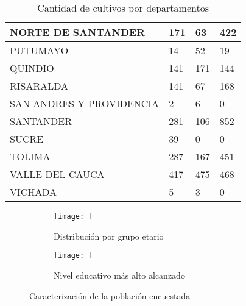 \documentclass[12pt,a4paper]{article}
\begin{document}
\begin{table}[]
\begin{tabular}{|llll|}
        \multicolumn{1}{|l|}{NORTE DE SANTANDER}       & \multicolumn{1}{l|}{171}               & \multicolumn{1}{l|}{63}              & 422           \\ \hline
        \multicolumn{1}{|l|}{PUTUMAYO}                 & \multicolumn{1}{l|}{14}                & \multicolumn{1}{l|}{52}              & 19            \\ \hline
        \multicolumn{1}{|l|}{QUINDIO}                  & \multicolumn{1}{l|}{141}               & \multicolumn{1}{l|}{171}             & 144           \\ \hline
        \multicolumn{1}{|l|}{RISARALDA}                & \multicolumn{1}{l|}{141}               & \multicolumn{1}{l|}{67}              & 168           \\ \hline
        \multicolumn{1}{|l|}{SAN ANDRES Y PROVIDENCIA} & \multicolumn{1}{l|}{2}                 & \multicolumn{1}{l|}{6}               & 0             \\ \hline
        \multicolumn{1}{|l|}{SANTANDER}                & \multicolumn{1}{l|}{281}               & \multicolumn{1}{l|}{106}             & 852           \\ \hline
        \multicolumn{1}{|l|}{SUCRE}                    & \multicolumn{1}{l|}{39}                & \multicolumn{1}{l|}{0}               & 0             \\ \hline
        \multicolumn{1}{|l|}{TOLIMA}                   & \multicolumn{1}{l|}{287}               & \multicolumn{1}{l|}{167}             & 451           \\ \hline
        \multicolumn{1}{|l|}{VALLE DEL CAUCA}          & \multicolumn{1}{l|}{417}               & \multicolumn{1}{l|}{475}             & 468           \\ \hline
        \multicolumn{1}{|l|}{VICHADA}                  & \multicolumn{1}{l|}{5}                 & \multicolumn{1}{l|}{3}               & 0             \\ \hline
    \end{tabular}
    \caption{Cantidad de cultivos por departamentos}
    \label{tab:contingencia}
\end{table}

\begin{figure}[h!]
    \centering
    \begin{subfigure}{0.45\linewidth}
        \centering
        \texttt{[image: ]}
        \caption{Distribución por grupo etario}
        \label{fig:f1}
    \end{subfigure}
    \hfill
    \begin{subfigure}{0.45\linewidth}
        \centering
        \texttt{[image: ]}
        \caption{Nivel educativo más alto alcanzado}
        \label{fig:f2}
    \end{subfigure}
    \caption{Caracterización de la población encuestada}
\end{figure}
\end{document}
